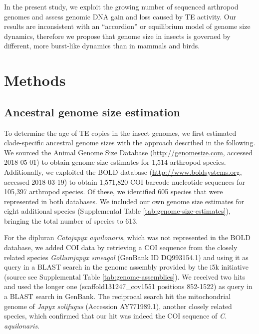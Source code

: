 In the present study, we exploit the growing number of sequenced
arthropod genomes and assess genomic DNA gain and loss caused by TE
activity. Our results are inconsistent with an ``accordion'' or
equilibrium model of genome size dynamics, therefore we propose that
genome size in insects is governed by different, more burst-like
dynamics than in mammals and birds.

\section{Methods}

\subsection*{Ancestral genome size
estimation}

To determine the age of TE copies in the insect genomes, we first
estimated clade-specific ancestral genome sizes with the approach
described in the following. We sourced the Animal Genome Size Database
\citep{Gregory2018} (\url{http://genomesize.com}, accessed 2018-05-01) to
obtain genome size estimates for 1,514 arthropod species. Additionally,
we exploited the BOLD database \citep{Ratnasingham2007}
(\url{http://www.boldsystems.org}, accessed 2018-03-19) to obtain
1,571,820 COI barcode nucleotide sequences for 105,397 arthropod
species. Of these, we identified 605 species that were represented in
both databases. We included our own genome size estimates for eight
additional species (Supplemental Table \ref{tab:genome-size-estimates}), bringing the total number of
species to 613.

For the dipluran \emph{Catajapyx aquilonaris}, which was not represented
in the BOLD database, we added COI data by retrieving a COI sequence
from the closely related species \emph{Gollumjapyx smeagol} (GenBank ID
DQ993154.1) and using it as query in a BLAST search in the genome
assembly provided by the i5k initiative (source see Supplemental Table
\ref{tab:genome-assemblies}). We received two hits and used the longer one
(scaffold131247\_cov1551 positions 852-1522) as query in a BLAST search
in GenBank. The reciprocal search hit the mitochondrial genome of
\emph{Japyx solifugus} (Accession AY771989.1), another closely related
species, which confirmed that our hit was indeed the COI sequence of
\emph{C. aquilonaris}.

